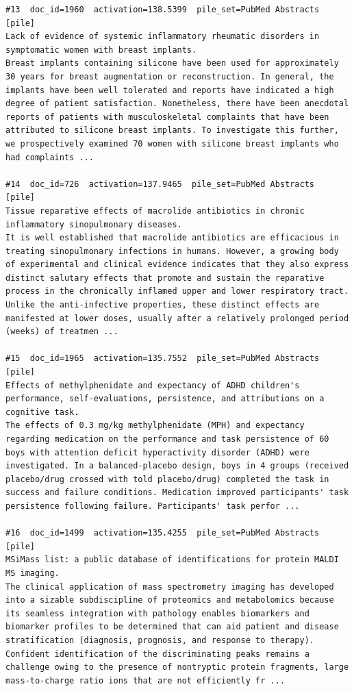 \begin{verbatim}
#13  doc_id=1960  activation=138.5399  pile_set=PubMed Abstracts  [pile]
Lack of evidence of systemic inflammatory rheumatic disorders in symptomatic women with breast implants.
Breast implants containing silicone have been used for approximately 30 years for breast augmentation or reconstruction. In general, the implants have been well tolerated and reports have indicated a high degree of patient satisfaction. Nonetheless, there have been anecdotal reports of patients with musculoskeletal complaints that have been attributed to silicone breast implants. To investigate this further, we prospectively examined 70 women with silicone breast implants who had complaints ...

#14  doc_id=726  activation=137.9465  pile_set=PubMed Abstracts  [pile]
Tissue reparative effects of macrolide antibiotics in chronic inflammatory sinopulmonary diseases.
It is well established that macrolide antibiotics are efficacious in treating sinopulmonary infections in humans. However, a growing body of experimental and clinical evidence indicates that they also express distinct salutary effects that promote and sustain the reparative process in the chronically inflamed upper and lower respiratory tract. Unlike the anti-infective properties, these distinct effects are manifested at lower doses, usually after a relatively prolonged period (weeks) of treatmen ...

#15  doc_id=1965  activation=135.7552  pile_set=PubMed Abstracts  [pile]
Effects of methylphenidate and expectancy of ADHD children's performance, self-evaluations, persistence, and attributions on a cognitive task.
The effects of 0.3 mg/kg methylphenidate (MPH) and expectancy regarding medication on the performance and task persistence of 60 boys with attention deficit hyperactivity disorder (ADHD) were investigated. In a balanced-placebo design, boys in 4 groups (received placebo/drug crossed with told placebo/drug) completed the task in success and failure conditions. Medication improved participants' task persistence following failure. Participants' task perfor ...

#16  doc_id=1499  activation=135.4255  pile_set=PubMed Abstracts  [pile]
MSiMass list: a public database of identifications for protein MALDI MS imaging.
The clinical application of mass spectrometry imaging has developed into a sizable subdiscipline of proteomics and metabolomics because its seamless integration with pathology enables biomarkers and biomarker profiles to be determined that can aid patient and disease stratification (diagnosis, prognosis, and response to therapy). Confident identification of the discriminating peaks remains a challenge owing to the presence of nontryptic protein fragments, large mass-to-charge ratio ions that are not efficiently fr ...


\end{verbatim}
